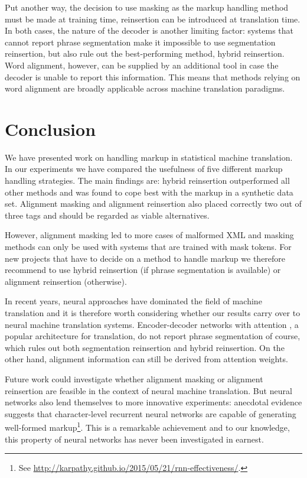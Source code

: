 \documentclass[11pt,letterpaper]{article}
\begin{document}
Put another way, the decision to use masking as the markup handling method must be made at training time, reinsertion can be introduced at translation time. In both cases, the nature of the decoder is another limiting factor: systems that cannot report phrase segmentation make it impossible to use segmentation reinsertion, but also rule out the best-performing method, hybrid reinsertion. Word alignment, however, can be supplied by an additional tool in case the decoder is unable to report this information. This means that methods relying on word alignment are broadly applicable across machine translation paradigms.

\section{Conclusion}

We have presented work on handling markup in statistical machine translation. In our experiments we have compared the usefulness of five different markup handling strategies. The main findings are: hybrid reinsertion outperformed all other methods and was found to cope best with the markup in a synthetic data set. Alignment masking and alignment reinsertion also placed correctly two out of three tags and should be regarded as viable alternatives. 

However, alignment masking led to more cases of malformed XML and masking methods can only be used with systems that are trained with mask tokens. For new projects that have to decide on a method to handle markup we therefore recommend to use hybrid reinsertion (if phrase segmentation is available) or alignment reinsertion (otherwise).

In recent years, neural approaches have dominated the field of machine translation and it is therefore worth considering whether our results carry over to neural machine translation systems. Encoder-decoder networks with attention \cite{bahdanau2014neural}, a popular architecture for translation, do not report phrase segmentation of course, which rules out both segmentation reinsertion and hybrid reinsertion. On the other hand, alignment information can still be derived from attention weights.

Future work could investigate whether alignment masking or alignment reinsertion are feasible in the context of neural machine translation. But neural networks also lend themselves to more innovative experiments: anecdotal evidence suggests that character-level recurrent neural networks \cite{hochreiter1997long} are capable of generating well-formed markup\footnote{See \url{http://karpathy.github.io/2015/05/21/rnn-effectiveness/}.}. This is a remarkable achievement and to our knowledge, this property of neural networks has never been investigated in earnest.
\end{document}
